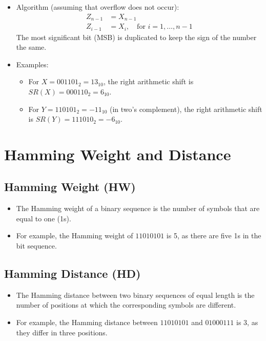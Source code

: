 \documentclass[12pt,openany, tikz,border=10pt]{book}
\begin{document}
\begin{itemize}
    \item[] Algorithm (assuming that overflow does not occur):
    \begin{align*}
        Z_{n-1} &= X_{n-1} \\
        Z_{i-1} &= X_i, \quad \text{for } i = 1, \ldots, n-1
    \end{align*}
    The most significant bit (MSB) is duplicated to keep the sign of the number the same.
    \item[] Examples:
    \begin{itemize}
        \item[] For $X = 001101_2 = 13_{10}$, the right arithmetic shift is $SR(X) = 000110_2 = 6_{10}$.
        \item[] For $Y = 110101_2 = -11_{10}$ (in two's complement), the right arithmetic shift is $SR(Y) = 111010_2 = -6_{10}$.
    \end{itemize}
\end{itemize}


\section{Hamming Weight and Distance}


\subsection{Hamming Weight (HW)}
\begin{itemize}
    \item[] The Hamming weight of a binary sequence is the number of symbols that are equal to one (1s).
    \item[] For example, the Hamming weight of \( 11010101 \) is 5, as there are five 1s in the bit sequence.
\end{itemize}

\subsection{Hamming Distance (HD)}
\begin{itemize}
    \item[] The Hamming distance between two binary sequences of equal length is the number of positions at which the corresponding symbols are different.
    \item[] For example, the Hamming distance between \( 11010101 \) and \( 01000111 \) is 3, as they differ in three positions.
\end{itemize}
\end{document}
